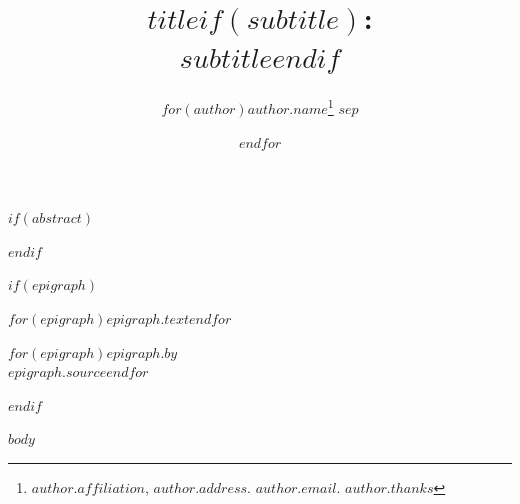 \documentclass[12pt,letterpaper,twoside]{article}
\title{\Large\textbf{{$title$}$if(subtitle)$:\\ $subtitle$}$endif$}
\author{$for(author)$\normalsize{$author.name$}\thanks{$author.affiliation$, $author.address$. $author.email$. $author.thanks$} $sep$ \and $endfor$}
\date{}
\begin{document}

\maketitle

$if(abstract)$
\begin{abstract}
\footnotesize
{}
\end{abstract}
$endif$

$if(epigraph)$
\epigraph{{$for(epigraph)$\itshape{$epigraph.text$}$endfor$}}%
{$for(epigraph)${$epigraph.by$}\\ {$epigraph.source$}$endfor$}
$endif$

\singlespacing

$body$
\end{document}
